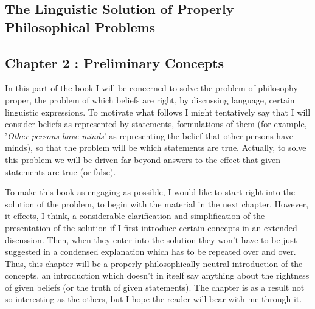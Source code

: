 \documentclass[10pt,twoside]{memoir}
\newcommand{\formulation}[1]{'\textit{#1}'}
\begin{document}
\begin{enumerate}
\section{The Linguistic Solution of Properly Philosophical Problems}
\subsection*{Chapter 2 : Preliminary Concepts}

In this part of the book I will be concerned to solve the problem of 
philosophy proper, the problem of which beliefs are right, by discussing 
language, certain linguistic expressions. To motivate what follows I might 
tentatively say that I will consider beliefs as represented by statements, 
formulations of them (for example, \formulation{Other persons have minds} as 
representing the belief that other persons have minds), so that the problem 
will be which statements are true. Actually, to solve this problem we will be 
driven far beyond answers to the effect that given statements are true (or 
false). 

To make this book as engaging as possible, I would like to start right 
into the solution of the problem, to begin with the material in the next 
chapter. However, it effects, I think, a considerable clarification and 
simplification of the presentation of the solution if I first introduce certain 
concepts in an extended discussion. Then, when they enter into the solution 
they won't have to be just suggested in a condensed explanation which has 
to be repeated over and over. Thus, this chapter will be a properly 
philosophically neutral introduction of the concepts, an introduction which 
doesn't in itself say anything about the rightness of given beliefs (or the 
truth of given statements). The chapter is as a result not so interesting as the 
others, but I hope the reader will bear with me through it. 


\end{enumerate}
\end{document}
